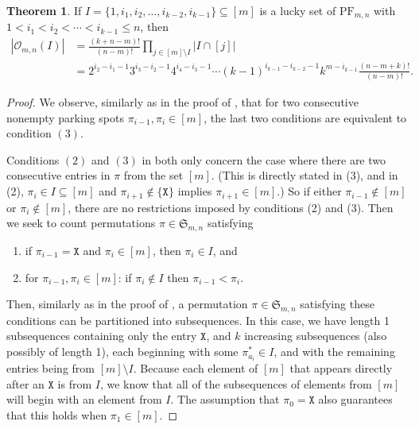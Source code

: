 \documentclass[reqno]{amsart}
\newcommand{\X}{\texttt{X}}
\newcommand{\Sym}{\mathfrak{S}}
\def\ci{\subseteq}
\newcommand{\PF}{\mathrm{PF}}
\theoremstyle{definition}
\newtheorem{theorem}{Theorem}[section]
\theoremstyle{remark}
\newcommand{\out}{\mathcal{O}}
\begin{document}
\begin{theorem}\label{thm:count for outcomes in mn}
If $I = \{1, i_1,i_2,\ldots, i_{k-2},i_{k-1}\}\subseteq[m]$ is a lucky set of $\PF_{m,n}$ with $1<i_1<i_2<\cdots<i_{k-1}\leq n$, then
\begin{align*}
    |\out_{m,n}(I)| &=\frac{(k+n-m)!}{(n-m)!} \prod_{j\in [m]\setminus I} |I\cap [j]|\\
    &=2^{i_2-i_1-1}3^{i_3-i_2-1}4^{i_4-i_3-1}\cdots (k-1)^{i_{k-1}-i_{k-2}-1}k^{m-i_{k-1}}\frac{(n-m+k)!}{(n-m)!}.
\end{align*}
\end{theorem}
\begin{proof}

We observe, similarly as in the proof of , that for two consecutive nonempty parking spots $\pi_{i-1}, \pi_i \in [m]$, the last two conditions are equivalent to condition $(3)$.

Conditions $(2)$ and $(3)$ in  both only concern the case where there are two consecutive entries in $\pi$ from the set $[m]$. (This is directly stated in (3), and in (2), $\pi_i \in I \ci [m]$ and $\pi_{i+1} \notin \{\X\}$ implies $\pi_{i+1}\in [m]$.)
So if either $\pi_{i-1} \notin [m]$ or $\pi_{i} \notin [m]$, there are no restrictions imposed by conditions (2) and (3). Then we seek to count permutations $\pi \in \Sym_{m,n}$ satisfying
\begin{enumerate}
    \item if $\pi_{i-1}=\X$ and $\pi_i\in[m]$, then $\pi_i\in I$, and
 
       \item for $\pi_{i-1}, \pi_i \in [m]$: if $\pi_{i}\not\in I$ then $\pi_{i-1}<\pi_{i}$.
    \end{enumerate}
    
Then, similarly as in the proof of , a permutation $\pi \in \Sym_{m,n}$ satisfying these conditions can be partitioned into subsequences. 
In this case, we have length 1 subsequences containing only the entry $\X$, and $k$ increasing subsequences (also possibly of length 1), each beginning with some $\pi_{a_i}^* \in I$, and with the remaining entries being from $[m] \setminus I$. 
Because each element of $[m]$ that appears directly after an $\X$ is from $I$, we know that all of the subsequences of elements from $[m]$ will begin with an element from $I$. The assumption that $\pi_0 = \X$ also guarantees that this holds when $\pi_1 \in [m]$.


\end{proof}
\end{document}
